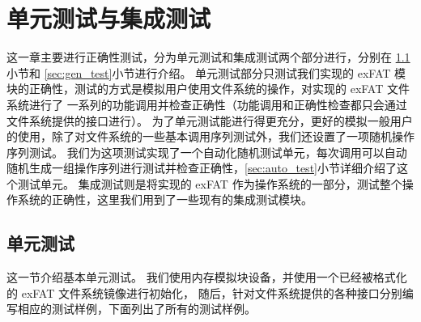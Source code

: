 
\chapter{单元测试与集成测试}
这一章主要进行正确性测试，分为单元测试和集成测试两个部分进行，分别在 \ref{sec:unit_test}小节和 \ref{sec:gen_test}小节进行介绍。
单元测试部分只测试我们实现的 exFAT 模块的正确性，测试的方式是模拟用户使用文件系统的操作，对实现的 exFAT 文件系统进行了
一系列的功能调用并检查正确性（功能调用和正确性检查都只会通过文件系统提供的接口进行）。
为了单元测试能进行得更充分，更好的模拟一般用户的使用，除了对文件系统的一些基本调用序列测试外，我们还设置了一项随机操作序列测试。
我们为这项测试实现了一个自动化随机测试单元，每次调用可以自动随机生成一组操作序列进行测试并检查正确性，\ref{sec:auto_test}小节详细介绍了这个测试单元。
集成测试则是将实现的 exFAT 作为操作系统的一部分，测试整个操作系统的正确性，这里我们用到了一些现有的集成测试模块。

\section{单元测试}\label{sec:unit_test}
这一节介绍基本单元测试。
我们使用内存模拟块设备，并使用一个已经被格式化的 exFAT 文件系统镜像进行初始化，
随后，针对文件系统提供的各种接口分别编写相应的测试样例，下面列出了所有的测试样例。

